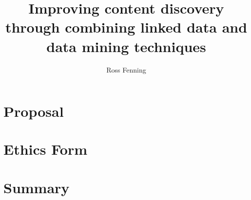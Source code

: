 \documentclass[10pt,a4paper]{report}
\title{Improving content discovery through combining linked data and data mining techniques}
\author{Ross Fenning}
\begin{document}
\maketitle
\tableofcontents












\appendix

\chapter{Proposal}
\chapter{Ethics Form}

\chapter{Summary}
\end{document}
